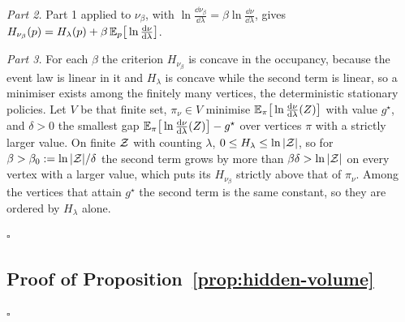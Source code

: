 \emph{Part 2.}
Part 1 applied to $\nu_\beta$, with $\ln \tfrac{\dd\nu_\beta}{\dd\lambda} = \beta \ln \tfrac{\dd\nu}{\dd\lambda}$, gives $H_{\nu_\beta}(p) = H_\lambda(p) + \beta\, \mathbb E_p\big[\ln \tfrac{\mathrm d\nu}{\mathrm d\lambda}\big]$.

\emph{Part 3.}
For each $\beta$ the criterion $H_{\nu_\beta}$ is concave in the occupancy, because the event law is linear in it and $H_\lambda$ is concave while the second term is linear, so a minimiser exists among the finitely many vertices, the deterministic stationary policies.
Let $V$ be that finite set, $\pi_\nu \in V$ minimise $\mathbb E_\pi\big[\ln \tfrac{\mathrm d\nu}{\mathrm d\lambda}(Z)\big]$ with value $g^\star$, and $\delta > 0$ the smallest gap $\mathbb E_\pi\big[\ln \tfrac{\mathrm d\nu}{\mathrm d\lambda}(Z)\big] - g^\star$ over vertices $\pi$ with a strictly larger value.
On finite $\mathcal Z$ with counting $\lambda$, $0 \le H_\lambda \le \ln |\mathcal Z|$, so for $\beta > \beta_0 := \ln|\mathcal Z| / \delta$ the second term grows by more than $\beta\delta > \ln|\mathcal Z|$ on every vertex with a larger value, which puts its $H_{\nu_\beta}$ strictly above that of $\pi_\nu$.
Among the vertices that attain $g^\star$ the second term is the same constant, so they are ordered by $H_\lambda$ alone.

\hfill$\square$

\subsection{Proof of Proposition~\ref{prop:hidden-volume}}
\label{sup:proof-hidden-volume}
\hfill$\square$

